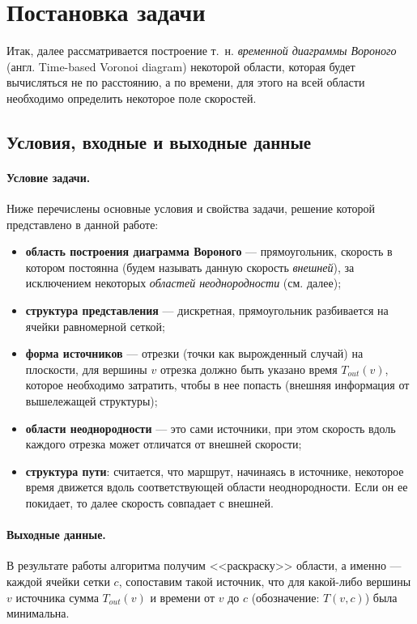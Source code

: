 \documentclass[12pt]{article}
\begin{document}
\section{Постановка задачи}
\label{task}
Итак, далее рассматривается построение т.~н. \emph{временной диаграммы Вороного}
(англ. Time-based Voronoi diagram) некоторой области, которая будет 
вычисляться не по расстоянию, а по времени, для этого на всей области
необходимо определить некоторое поле скоростей.

\subsection{Условия, входные и выходные данные}
\label{props}

\paragraph{Условие задачи.} Ниже перечислены
основные условия и свойства задачи, решение которой представлено в данной работе:
\begin{itemize}
\item \textbf{область построения диаграмма Вороного} --- прямоугольник, 
скорость в котором постоянна (будем называть данную скорость \emph{внешней}), за 
исключением некоторых \emph{областей неоднородности} (см. далее);
\item \textbf{структура представления} --- дискретная, прямоугольник разбивается на 
ячейки равномерной сеткой;
\item \textbf{форма источников} --- отрезки (точки как вырожденный случай)
на плоскости, для вершины $v$ отрезка должно быть указано время $T_{out}(v)$, 
которое необходимо  затратить, 
чтобы в нее попасть (внешняя информация от вышележащей структуры);
\item \textbf{области неоднородности} --- это сами источники, 
при этом скорость вдоль каждого отрезка может отличатся от
внешней скорости;
\item \textbf{структура пути}: считается, что маршрут, начинаясь в источнике,
некоторое время движется вдоль соответствующей области неоднородности.
Если он ее покидает, то далее скорость совпадает с внешней.
\end{itemize}

\paragraph{Выходные данные.}
В результате работы алгоритма получим <<раскраску>> области, 
а именно --- каждой ячейки сетки $c$, сопоставим такой источник, 
что для какой-либо вершины $v$ источника сумма $T_{out}(v)$ и времени от 
$v$ до $c$ (обозначение: $T(v, c)$) была минимальна.
\end{document}
